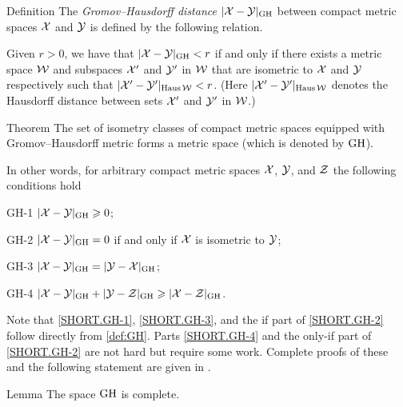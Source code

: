 \begin{thm}{Definition}\label{def:GH}
The \emph{Gromov--Hausdorff distance} $|\mathcal{X}-\mathcal{Y}|_{\operatorname{\rm GH}\nolimits}$ between compact metric spaces $\mathcal{X}$ and $\mathcal{Y}$
is defined by the following
relation.
 
Given  $r > 0$, we have that $|\mathcal{X}-\mathcal{Y}|_{\operatorname{\rm GH}\nolimits} < r$ if and only if there exists a metric
space $\mathcal{W}$ and subspaces $\mathcal{X}'$ and $\mathcal{Y}'$ in $\mathcal{W}$ that are isometric to $\mathcal{X}$ and $\mathcal{Y}$
respectively such that $|\mathcal{X}'-\mathcal{Y}'|_{\operatorname{\rm Haus}\nolimits\mathcal{W}} < r$. 
(Here $|\mathcal{X}'-\mathcal{Y}'|_{\operatorname{\rm Haus}\nolimits\mathcal{W}}$ denotes the Hausdorff distance between sets $\mathcal{X}'$ and $\mathcal{Y}'$ in $\mathcal{W}$.)
\end{thm}

\begin{thm}{Theorem}\label{thm:GH-is-a-metric}
The set of isometry classes of compact metric spaces equipped with Gromov--Hausdorff metric forms a metric space (which is denoted by $\operatorname{\rm GH}\nolimits$).

In other words, for arbitrary compact metric spaces $\mathcal{X}$, $\mathcal{Y}$, and $\mathcal{Z}$ the following conditions hold

\begin{subthm}{GH-1} $|\mathcal{X}-\mathcal{Y}|_{\operatorname{\rm GH}\nolimits}\geqslant 0$;
\end{subthm}

\begin{subthm}{GH-2} $|\mathcal{X}-\mathcal{Y}|_{\operatorname{\rm GH}\nolimits}=0$ if and only if $\mathcal{X}$ is isometric to $\mathcal{Y}$;
\end{subthm}

\begin{subthm}{GH-3} $|\mathcal{X}-\mathcal{Y}|_{\operatorname{\rm GH}\nolimits}=|\mathcal{Y}-\mathcal{X}|_{\operatorname{\rm GH}\nolimits}$;
\end{subthm}

\begin{subthm}{GH-4} $|\mathcal{X}-\mathcal{Y}|_{\operatorname{\rm GH}\nolimits}+|\mathcal{Y}-\mathcal{Z}|_{\operatorname{\rm GH}\nolimits}\geqslant |\mathcal{X}-\mathcal{Z}|_{\operatorname{\rm GH}\nolimits}$.
\end{subthm}
\end{thm}

Note that \ref{SHORT.GH-1}, \ref{SHORT.GH-3},
and the if part of \ref{SHORT.GH-2} follow directly from \ref{def:GH}.
Parts \ref{SHORT.GH-4} and the only-if part of \ref{SHORT.GH-2} are not hard but require some work.
Complete proofs of these and the following statement  are given in \cite[Lecture 5
]{petrunin2023pure}.

\begin{thm}{Lemma}\label{lem:GH-complete}
The space $\operatorname{\rm GH}\nolimits$ is complete.
\end{thm}

